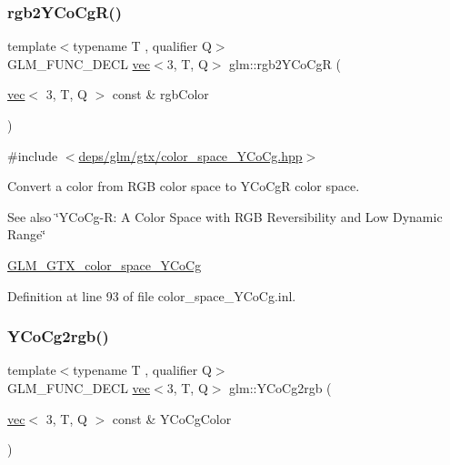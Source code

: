 \subsubsection{\texorpdfstring{rgb2\+Y\+Co\+Cg\+R()}{rgb2YCoCgR()}}
{\footnotesize\ttfamily template$<$typename T , qualifier Q$>$ \\
G\+L\+M\+\_\+\+F\+U\+N\+C\+\_\+\+D\+E\+CL \hyperlink{structglm_1_1vec}{vec}$<$3, T, Q$>$ glm\+::rgb2\+Y\+Co\+CgR (\begin{DoxyParamCaption}\item[{\hyperlink{structglm_1_1vec}{vec}$<$ 3, T, Q $>$ const \&}]{rgb\+Color }\end{DoxyParamCaption})}



{\ttfamily \#include $<$\hyperlink{color__space__YCoCg_8hpp}{deps/glm/gtx/color\+\_\+space\+\_\+\+Y\+Co\+Cg.\+hpp}$>$}

Convert a color from R\+GB color space to Y\+Co\+CgR color space. \begin{DoxySeeAlso}{See also}
\char`\"{}\+Y\+Co\+Cg-\/\+R\+: A Color Space with R\+G\+B Reversibility and Low Dynamic Range\char`\"{} 

\hyperlink{group__gtx__color__space__YCoCg}{G\+L\+M\+\_\+\+G\+T\+X\+\_\+color\+\_\+space\+\_\+\+Y\+Co\+Cg} 
\end{DoxySeeAlso}


Definition at line 93 of file color\+\_\+space\+\_\+\+Y\+Co\+Cg.\+inl.

\mbox{\label{group__gtx__color__space__YCoCg_ga163596b804c7241810b2534a99eb1343}} 
\subsubsection{\texorpdfstring{Y\+Co\+Cg2rgb()}{YCoCg2rgb()}}
{\footnotesize\ttfamily template$<$typename T , qualifier Q$>$ \\
G\+L\+M\+\_\+\+F\+U\+N\+C\+\_\+\+D\+E\+CL \hyperlink{structglm_1_1vec}{vec}$<$3, T, Q$>$ glm\+::\+Y\+Co\+Cg2rgb (\begin{DoxyParamCaption}\item[{\hyperlink{structglm_1_1vec}{vec}$<$ 3, T, Q $>$ const \&}]{Y\+Co\+Cg\+Color }\end{DoxyParamCaption})}



